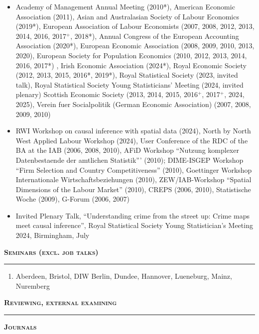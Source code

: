 \documentclass[10pt,pdftex,a4paper,oneside]{article}
\begin{document}
\begin{itemize}[noitemsep,nolistsep]
\item[] Academy of Management Annual Meeting (2010*), American Economic Association (2011), Asian and Australasian Society of Labour Economics (2019*), European Association of Labour Economists (2007, 2008, 2012, 2013, 2014, 2016, 2017$^+$, 2018*),  Annual Congress of the European Accounting Association (2020*), European Economic Association (2008, 2009, 2010, 2013, 2020), European Society for Population Economics (2010, 2012, 2013, 2014, 2016, 2017*) , Irish Economic Association (2024*), Royal Economic Society (2012, 2013, 2015, 2016*, 2019*), Royal Statistical Society (2023, invited talk), Royal Statistical Society Young Statisticians' Meeting (2024, invited plenary) Scottish Economic Society (2013, 2014, 2015, 2016$^+$, 2017$^+$, 2024, 2025), Verein fuer Socialpolitik (German Economic Association) (2007, 2008, 2009, 2010)
\item[] RWI Workshop on causal inference with spatial data (2024), North by North West Applied Labour Workshop (2024), User Conference of the RDC of the BA at the IAB (2006, 2008, 2010), AFiD Workshop ``Nutzung komplexer Datenbestaende der amtlichen Statistik''' (2010); DIME-ISGEP Workshop ``Firm Selection and Country Competitiveness'' (2010), Goettinger Workshop Internationale Wirtschaftsbeziehungen (2010), ZEW/IAB-Workshop ``Spatial Dimensions of the Labour Market'' (2010), CREPS (2006, 2010), Statistische Woche (2009), G-Forum (2006, 2007)
\item[] Invited Plenary Talk, ``Understanding crime from the street up: Crime maps meet causal inference'', Royal Statistical Society Young Statistician's Meeting 2024, Birmingham, July
\end{itemize}


\textbf{\textsc{Seminars (excl. job talks)}}
\vspace{.5ex}
\hrule
\begin{enumerate}
\item[]  Aberdeen, Bristol, DIW Berlin, Dundee, Hannover, Lueneburg, Mainz, Nuremberg
\end{enumerate}


\textbf{\textsc{Reviewing, external examining}}
\vspace{.5ex}
\hrule
\textbf{\textsc{Journals}}
\end{document}
